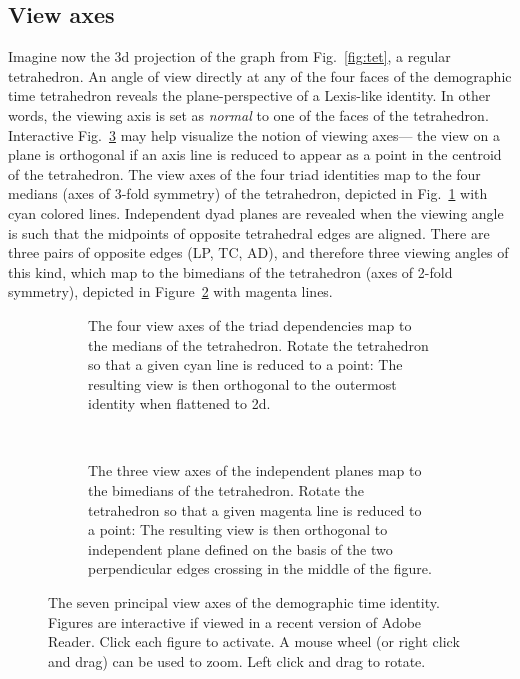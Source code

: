 \documentclass{bmcart}
\begin{document}
\subsection*{View axes}
\label{sec:viewaxes}
Imagine now the 3d projection of the graph from Fig.~\ref{fig:tet}, a regular tetrahedron. An angle of view directly at any of the four faces of the demographic time tetrahedron reveals the plane-perspective of a Lexis-like identity. In other words, the viewing axis is set as \emph{normal} to one of the faces of the tetrahedron. Interactive Fig.~\ref{fig:viewaxes} may help visualize the notion of viewing axes--- the view on a plane is orthogonal if an axis line is reduced to appear as a point in the centroid of the tetrahedron. The view axes of the four triad identities map to the four medians (axes of 3-fold symmetry) of the tetrahedron, depicted in Fig.~\ref{fig:depviewaxes} with cyan colored lines. Independent dyad planes are revealed when the viewing angle is such that the midpoints of opposite tetrahedral edges are aligned. There are three pairs of opposite edges (LP, TC, AD), and therefore three viewing angles of this kind, which map to the bimedians of the tetrahedron (axes of 2-fold symmetry), depicted in Figure~\ref{fig:indepviewaxes} with magenta lines.

\begin{figure}
\begin{subfigure}[t]{0.45\linewidth}
    \centering
    
    \caption{The four view axes of the triad dependencies map to the medians of the tetrahedron. Rotate the tetrahedron so that a given cyan line is reduced to a point: The resulting view is then orthogonal to the outermost identity when flattened to 2d.}
    \label{fig:depviewaxes}
\end{subfigure}
~~
\begin{subfigure}[t]{0.45\linewidth}
    
    \caption{The three view axes of the independent planes map to the bimedians of the tetrahedron. Rotate the tetrahedron so that a given magenta line is reduced to a point: The resulting view is then orthogonal to independent plane defined on the basis of the two perpendicular edges crossing in the middle of the figure.}
    \label{fig:indepviewaxes}       
\end{subfigure}
\caption{The seven principal view axes of the demographic time identity. Figures are interactive if viewed in a recent version of Adobe Reader. Click each figure to activate. A mouse wheel (or right click and drag) can be used to zoom. Left click and drag to rotate.}
\label{fig:viewaxes}
\end{figure}
\end{document}
